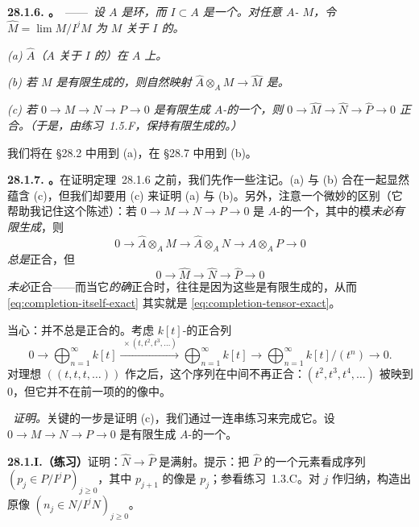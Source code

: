 \textbf{28.1.6. \trhTheorem。}\ ——\ \emph{设 $A$ 是\trNoether{}环，而 $I\subset A$ 是一个\trIdeal。对任意 $A$-\trModule{} $M$，令 $\hat{M}=\lim M/I^jM$ 为 $M$ 关于 $I$ 的\trCompletion。}

\emph{(a) \trCompletion{} $\hat{A}$（$A$ 关于 $I$ 的\trCompletion）在 $A$ 上\trFlat。}

\emph{(b) 若 $M$ 是有限生成的，则自然映射 $\hat{A}\otimes_A M\to\hat{M}$ 是\trIsomorphism。}

\emph{(c) 若 $0\to M\to N\to P\to 0$ 是有限生成 $A$-\trModule{}的一个\trShortExactSequence，则 $0\to\hat{M}\to\hat{N}\to\hat{P}\to 0$ 正合。（于是，由\mbox{练习~1.5.F}，\trCompletion{}保持有限生成\trModule{}的\trExactSequence。）}

我们将在 \S28.2 中用到 (a)，在 \S28.7 中用到 (b)。

\textbf{28.1.7. \trhRemark。}\quad 在证明\mbox{定理~28.1.6} 之前，我们先作一些注记。(a) 与 (b) 合在一起显然蕴含 (c)，但我们却要用 (c) 来证明 (a) 与 (b)。另外，注意一个微妙的区别（它帮助我记住这个陈述）：若 $0\to M\to N\to P\to 0$ 是 $A$-\trModule{}的一个\trExactSequence，其中的模\emph{未必有限生成}，则
\begin{equation*}
\tag{28.1.7.1}\label{eq:completion-tensor-exact}
0\longrightarrow \hat{A}\otimes_A M\longrightarrow \hat{A}\otimes_A N\longrightarrow \hat{A}\otimes_A P\longrightarrow 0
\end{equation*}
\emph{总是}正合，但
\begin{equation*}
\tag{28.1.7.2}\label{eq:completion-itself-exact}
0\longrightarrow \hat{M}\longrightarrow \hat{N}\longrightarrow \hat{P}\longrightarrow 0
\end{equation*}
\emph{未必}正合——而当它\emph{的确}正合时，往往是因为这些\trModule{}是有限生成的，从而 \eqref{eq:completion-itself-exact} 其实就是 \eqref{eq:completion-tensor-exact}。

当心：\trCompletion{}并不总是正合的。考虑 $k[t]$-\trModule{}的正合列
\[
0\longrightarrow \bigoplus_{n=1}^{\infty}k[t]\xrightarrow{\ \times(t,t^2,t^3,\dots)\ }\bigoplus_{n=1}^{\infty}k[t]\longrightarrow \bigoplus_{n=1}^{\infty}k[t]/(t^n)\longrightarrow 0.
\]
对理想 $((t,t,t,\dots))$ 作\trCompletion{}之后，这个序列在中间不再正合：$(t^2,t^3,t^4,\dots)$ 被映到 $0$，但它并不在前一项的\trCompletion{}的像中。

\extrahard\ \emph{证明。}\quad 关键的一步是证明 (c)，我们通过一连串练习来完成它。设 $0\to M\to N\to P\to 0$ 是有限生成 $A$-\trModule{}的一个\trShortExactSequence。

\textbf{28.1.I.（练习）}\quad 证明：$\hat{N}\to\hat{P}$ 是满射。提示：把 $\hat{P}$ 的一个元素看成序列 $(p_j\in P/I^jP)_{j\ge 0}$，其中 $p_{j+1}$ 的像是 $p_j$；参看\mbox{练习~1.3.C}。对 $j$ 作归纳，构造出原像 $(n_j\in N/I^jN)_{j\ge 0}$。

